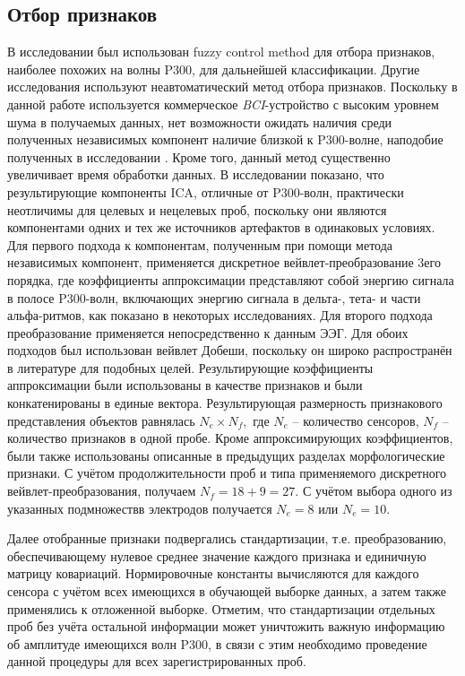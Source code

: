 \documentclass[12pt,fleqn]{article}
\begin{document}
	\subsection{Отбор признаков}
	\par В исследовании \cite{Piccione} был использован fuzzy control method для отбора признаков, наиболее похожих на волны P300, для дальнейшей классификации. Другие исследования используют неавтоматический метод отбора признаков. Поскольку в данной работе используется коммерческое {\it BCI}-устройство с высоким уровнем шума в получаемых данных, нет возможности ожидать наличия среди полученных независимых компонент наличие близкой к P300-волне, наподобие полученных в исследовании \cite{Piccione}. Кроме того, данный метод существенно увеличивает время обработки данных. В исследовании \cite{James} показано, что результирующие компоненты ICA, отличные от P300-волн, практически неотличимы для целевых и нецелевых проб, поскольку они являются компонентами одних и тех же источников артефактов в одинаковых условиях. Для первого подхода к компонентам, полученным при помощи метода независимых компонент, применяется дискретное вейвлет-преобразование 3его порядка, где коэффициенты аппроксимации представляют собой  энергию сигнала в полосе P300-волн, включающих энергию сигнала в дельта-, тета- и части альфа-ритмов, как показано в некоторых исследованиях. Для второго подхода преобразование применяется непосредственно к данным ЭЭГ. Для обоих подходов был использован вейвлет Добеши, поскольку он широко распространён в литературе для подобных целей. Результирующие коэффициенты аппроксимации были использованы в качестве признаков и были конкатенированы в единые вектора. Результирующая размерность признакового представления объектов равнялась $N_e \times N_f,$ где $N_e$ -- количество сенсоров, $N_f$ -- количество признаков в одной пробе. Кроме аппроксимирующих коэффициентов, были также использованы описанные в предыдущих разделах морфологические признаки. С учётом продолжительности проб и типа применяемого дискретного вейвлет-преобразования, получаем $N_f = 18 + 9 = 27.$ С учётом выбора одного из указанных подмножествв электродов получается $N_e = 8$ или $N_e = 10.$
	\par Далее отобранные признаки подвергались стандартизации, т.е. преобразованию, обеспечивающему нулевое среднее значение каждого признака и единичную матрицу ковариаций. Нормировочные константы вычисляются для каждого сенсора с учётом всех имеющихся в обучающей выборке данных, а затем также применялись к отложенной выборке. Отметим, что стандартизации отдельных проб без учёта остальной информации может уничтожить важную информацию об амплитуде имеющихся волн P300, в связи с этим необходимо проведение данной процедуры для всех зарегистрированных проб.
\end{document}
